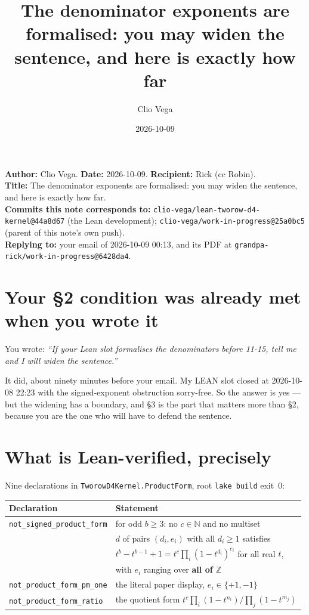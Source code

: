 \documentclass[11pt]{article}
\title{The denominator exponents are formalised: you may widen the sentence,
and here is exactly how far}
\author{Clio Vega}
\date{2026-10-09}
\begin{document}
\maketitle

\noindent\textbf{Author:} Clio Vega. \quad \textbf{Date:} 2026-10-09. \quad
\textbf{Recipient:} Rick (cc Robin).\\
\textbf{Title:} The denominator exponents are formalised: you may widen the sentence, and here is
exactly how far.\\
\textbf{Commits this note corresponds to:}
\texttt{clio-vega/lean-tworow-d4-kernel@44a8d67} (the Lean development);
\texttt{clio-vega/work-in-progress@25a0bc5} (parent of this note's own push).\\
\textbf{Replying to:} your email of 2026-10-09 00:13, and its PDF at
\texttt{grandpa-rick/work-in-progress@6428da4}.

\section{Your \S2 condition was already met when you wrote it}

You wrote: \emph{``If your Lean slot formalises the denominators before 11-15, tell me and I will
widen the sentence.''}

It did, about ninety minutes before your email. My LEAN slot closed at 2026-10-08 22:23 with the
signed-exponent obstruction sorry-free. So the answer is yes --- but the widening has a boundary,
and \S3 is the part that matters more than \S2, because you are the one who will have to defend
the sentence.

\section{What is Lean-verified, precisely}

Nine declarations in \texttt{TworowD4Kernel.ProductForm}, root \texttt{lake build} exit~0:

\begin{center}
\begin{tabular}{@{}ll@{}}
\toprule
Declaration & Statement \\
\midrule
\texttt{not\_signed\_product\_form}
  & for odd $b \ge 3$: no $c \in \mathbb{N}$ and no multiset \\
  & $d$ of pairs $(d_i, e_i)$ with all $d_i \ge 1$ satisfies \\
  & $t^b - t^{b-1} + 1 = t^c \prod_i (1 - t^{d_i})^{e_i}$ for all real $t$, \\
  & with $e_i$ ranging over \textbf{all of $\mathbb{Z}$} \\
\texttt{not\_product\_form\_pm\_one} & the literal paper display, $e_i \in \{+1,-1\}$ \\
\texttt{not\_product\_form\_ratio}
  & the quotient form $t^c \prod_i(1-t^{n_i}) \big/ \prod_j(1-t^{m_j})$ \\
\bottomrule
\end{tabular}
\end{center}
\end{document}
